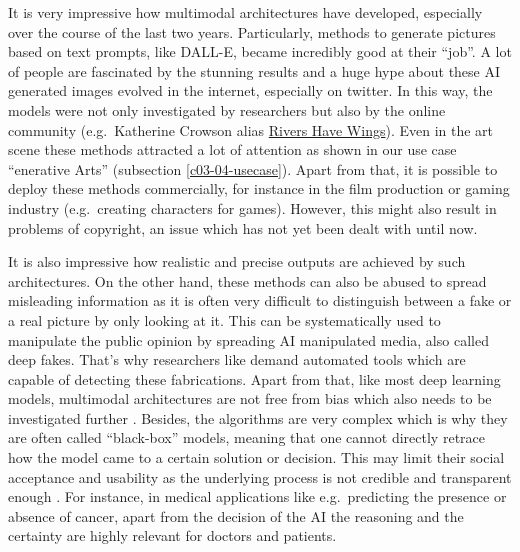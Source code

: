 \documentclass[
]{krantz}
\begin{document}
It is very impressive how multimodal architectures have developed, especially over the course of the last two years. Particularly, methods to generate pictures based on text prompts, like DALL-E, became incredibly good at their ``job''. A lot of people are fascinated by the stunning results and a huge hype about these AI generated images evolved in the internet, especially on twitter. In this way, the models were not only investigated by researchers but also by the online community (e.g.~Katherine Crowson alias \href{https://twitter.com/RiversHaveWings}{Rivers Have Wings}). Even in the art scene these methods attracted a lot of attention as shown in our use case ``enerative Arts'' (subsection \ref{c03-04-usecase}). Apart from that, it is possible to deploy these methods commercially, for instance in the film production or gaming industry (e.g.~creating characters for games). However, this might also result in problems of copyright, an issue which has not yet been dealt with until now.

It is also impressive how realistic and precise outputs are achieved by such architectures. On the other hand, these methods can also be abused to spread misleading information as it is often very difficult to distinguish between a fake or a real picture by only looking at it. This can be systematically used to manipulate the public opinion by spreading AI manipulated media, also called deep fakes. That's why researchers like \citet{explainaility} demand automated tools which are capable of detecting these fabrications. Apart from that, like most deep learning models, multimodal architectures are not free from bias which also needs to be investigated further \citep{bias}. Besides, the algorithms are very complex which is why they are often called ``black-box'' models, meaning that one cannot directly retrace how the model came to a certain solution or decision. This may limit their social acceptance and usability as the underlying process is not credible and transparent enough \citep{explainaility}. For instance, in medical applications like e.g.~predicting the presence or absence of cancer, apart from the decision of the AI the reasoning and the certainty are highly relevant for doctors and patients.
\end{document}
